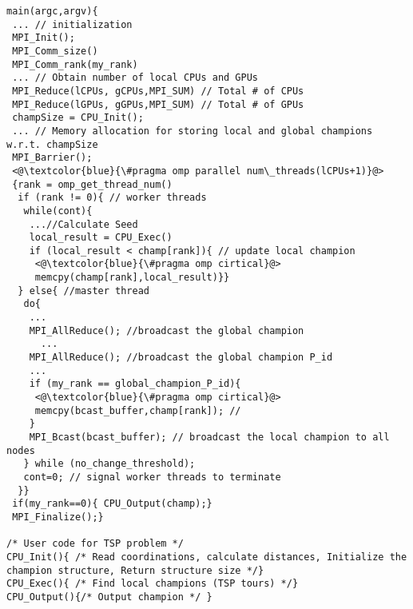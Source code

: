 \begin{frame}{}
  \lstset{language=C}
 \begin{lstlisting}[caption={ILCS Overview},label={lst:ilcs}]
main(argc,argv){
 ... // initialization
 MPI_Init();
 MPI_Comm_size()
 MPI_Comm_rank(my_rank)
 ... // Obtain number of local CPUs and GPUs
 MPI_Reduce(lCPUs, gCPUs,MPI_SUM) // Total # of CPUs
 MPI_Reduce(lGPUs, gGPUs,MPI_SUM) // Total # of GPUs
 champSize = CPU_Init();
 ... // Memory allocation for storing local and global champions w.r.t. champSize
 MPI_Barrier();
 <@\textcolor{blue}{\#pragma omp parallel num\_threads(lCPUs+1)}@>
 {rank = omp_get_thread_num()
  if (rank != 0){ // worker threads
   while(cont){
    ...//Calculate Seed
    local_result = CPU_Exec()
    if (local_result < champ[rank]){ // update local champion
     <@\textcolor{blue}{\#pragma omp cirtical}@>
     memcpy(champ[rank],local_result)}}
  } else{ //master thread
   do{
    ...
    MPI_AllReduce(); //broadcast the global champion 
	  ...
    MPI_AllReduce(); //broadcast the global champion P_id
    ...
    if (my_rank == global_champion_P_id){
     <@\textcolor{blue}{\#pragma omp cirtical}@>
     memcpy(bcast_buffer,champ[rank]); // 
    }
    MPI_Bcast(bcast_buffer); // broadcast the local champion to all nodes
   } while (no_change_threshold);
   cont=0; // signal worker threads to terminate
  }}
 if(my_rank==0){ CPU_Output(champ);}
 MPI_Finalize();}

/* User code for TSP problem */
CPU_Init(){ /* Read coordinations, calculate distances, Initialize the champion structure, Return structure size */}
CPU_Exec(){ /* Find local champions (TSP tours) */}
CPU_Output(){/* Output champion */ }
\end{lstlisting}
\end{frame}